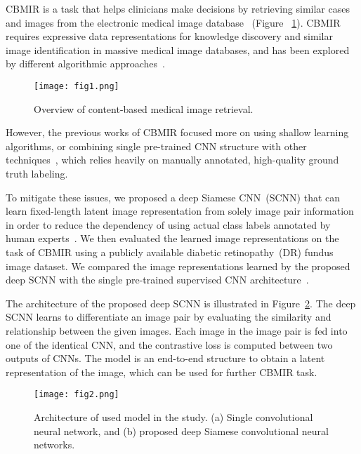 \documentclass{article}
\begin{document}
CBMIR is a task that helps clinicians make decisions by retrieving similar cases and images from the electronic medical image database~\citep{muller2004review} (Figure ~\ref{fig:cbmir}). CBMIR requires expressive data representations for knowledge discovery and similar image identification in massive medical image databases, and has been explored by different algorithmic approaches~\citep{kumar2013content,muller2004review}. 

\begin{figure}[ht]
  \centering
  \texttt{[image: fig1.png]}
  \caption{Overview of content-based medical image retrieval.}
  \label{fig:cbmir}
\end{figure}

However, the previous works of CBMIR focused more on using shallow learning algorithms, or combining single pre-trained CNN structure with other techniques~\citep{litjens2017survey,sun2017using,anavi2016visualizing,liu2016generating,shah2016deeply}, which relies heavily on manually annotated, high-quality ground truth labeling.

To mitigate these issues, we proposed a deep Siamese CNN~(SCNN) that can learn fixed-length latent image representation from solely image pair information in order to reduce the dependency of using actual class labels annotated by human experts~\citep{bromley1994signature}.
We then evaluated the learned image representations on the task of CBMIR using a publicly available diabetic retinopathy~(DR) fundus image dataset.
We compared the image representations learned by the proposed deep SCNN with the single pre-trained supervised CNN architecture~\citep{he2016deep}.

The architecture of the proposed deep SCNN is illustrated in Figure~\ref{fig:siamese-cnn}.
The deep SCNN learns to differentiate an image pair by evaluating the similarity and relationship between the given images.
Each image in the image pair is fed into one of the identical CNN, and the contrastive loss is computed between two outputs of CNNs.
The model is an end-to-end structure to obtain a latent representation of the image, which can be used for further CBMIR task.  

\begin{figure}[ht]
  \centering
  \texttt{[image: fig2.png]}
  \caption{Architecture of used model in the study. (a) Single convolutional neural network, and (b) proposed deep Siamese convolutional neural networks.}
  \label{fig:siamese-cnn}
\end{figure}
\end{document}
